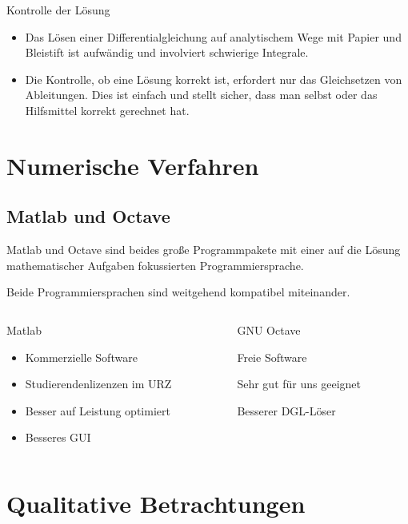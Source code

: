 \documentclass[notheorems,hidelinks,aspectratio=1610]{beamer}
\begin{document}
\begin{frame}{Kontrolle der Lösung}
  \begin{itemize}
  \item Das Lösen einer Differentialgleichung auf analytischem Wege mit
  \glqq{}Papier und Bleistift\grqq{} ist aufwändig und involviert
  schwierige Integrale.
\item Die Kontrolle, ob eine Lösung korrekt ist, erfordert nur das
  Gleichsetzen von Ableitungen. Dies ist einfach und stellt sicher,
  dass man selbst oder das Hilfsmittel korrekt gerechnet hat.
  \end{itemize}
\end{frame}

\section{Numerische Verfahren}
\frame{\sectoc}

\subsection{Matlab und Octave}
\begin{frame}
  Matlab und Octave sind beides große Programmpakete mit einer auf die
  Lösung mathematischer Aufgaben fokussierten Programmiersprache.

  Beide Programmiersprachen sind weitgehend kompatibel miteinander.

  \begin{columns}
    \begin{column}[t]{.49\textwidth}
      \begin{block}{Matlab}
        \begin{itemize}
        \item Kommerzielle Software
        \item Studierendenlizenzen im URZ
        \item Besser auf Leistung optimiert
        \item Besseres GUI
        \end{itemize}
      \end{block}
    \end{column}
    \begin{column}[t]{.49\textwidth}
      \begin{block}{GNU Octave}
      \item Freie Software
      \item Sehr gut für uns geeignet
      \item Besserer DGL-Löser
      \end{block}
    \end{column}
  \end{columns}
\end{frame}

\section{Qualitative Betrachtungen}
\frame{\sectoc}
\end{document}
